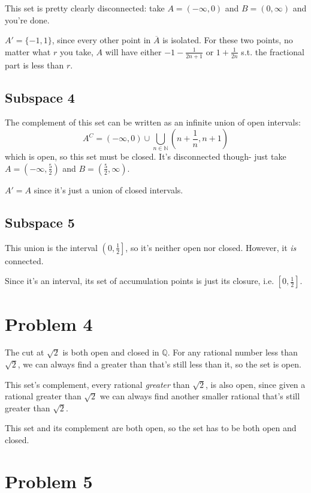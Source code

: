 \documentclass[12pt]{article}
\newcommand{\N}{\mathbb{N}}
\newcommand{\Q}{\mathbb{Q}}
\begin{document}
This set is pretty clearly disconnected: take $A=(-\infty, 0)$ and $B=(0, \infty)$ and you're done.

$A'=\{-1, 1\}$, since every other point in $\overline{A}$ is isolated.
For these two points, no matter what $r$ you take, $A$ will have either
$-1-\frac{1}{2n+1}$ or $1+\frac{1}{2n}$ s.t. the fractional part is less than $r$.

\subsection{Subspace 4}

The complement of this set can be written as an infinite union of open intervals:
\[A^C=(-\infty, 0) \cup \bigcup_{n \in \N} \left(n+\frac{1}{n}, n + 1\right)\]
which is open, so this set must be closed.
It's disconnected though- just take $A=\left(-\infty, \frac{5}{2}\right)$ and $B=\left(\frac{5}{2}, \infty\right)$.

$A'=A$ since it's just a union of closed intervals.

\subsection{Subspace 5}

This union is the interval $\left(0, \frac{1}{2}\right]$, so it's neither open nor closed.
However, it \textit{is} connected.

Since it's an interval, its set of accumulation points is just its closure, i.e. $\left[0, \frac{1}{2}\right]$.

\section{Problem 4}\label{sec:p4}

The cut at $\sqrt{2}$ is both open and closed in $\Q$.
For any rational number less than $\sqrt{2}$, we can always find
a greater than that's still less than it, so the set is open.

This set's complement, every rational \textit{greater} than $\sqrt{2}$,
is also open, since given a rational greater than $\sqrt{2}$
we can always find another smaller rational that's still greater than $\sqrt{2}$.

This set and its complement are both open, so the set has to be both open and closed.

\section{Problem 5}\label{sec:p5}
\end{document}
